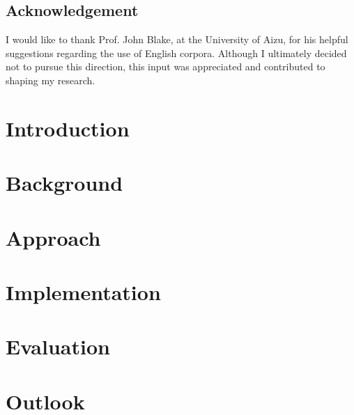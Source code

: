\documentclass[12pt]{report}
\begin{document}
\clearpage
\section*{Acknowledgement}
I would like to thank Prof. John Blake, at the University of Aizu, for his helpful suggestions regarding the use of English corpora.
Although I ultimately decided not to pursue this direction, this input was appreciated and contributed to shaping my research.

\clearpage
\tableofcontents
\clearpage

\chapter{Introduction} \label{ch:intro}

\chapter{Background} \label{ch:background}

\chapter{Approach} \label{ch:approach}

\chapter{Implementation} \label{ch:implementation}

\chapter{Evaluation} \label{ch:evaluation}

\chapter{Outlook} \label{ch:outlook}


% 



\end{document}
